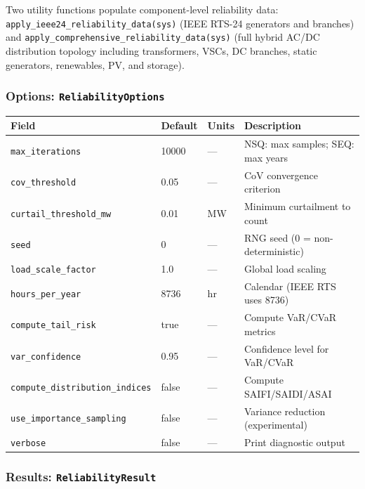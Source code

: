 Two utility functions populate component-level reliability data:
\texttt{apply\_ieee24\_reliability\_data(sys)} (IEEE RTS-24 generators and
branches) and \texttt{apply\_comprehensive\_reliability\_data(sys)} (full
hybrid AC/DC distribution topology including transformers, VSCs, DC branches,
static generators, renewables, PV, and storage).

\subsubsection{Options: \texttt{ReliabilityOptions}}

\begin{center}
\begin{tabular}{llll}
\hline\hline
\textbf{Field} & \textbf{Default} & \textbf{Units} & \textbf{Description} \\
\hline
\texttt{max\_iterations} & 10000 & --- & NSQ: max samples; SEQ: max years \\
\texttt{cov\_threshold} & 0.05 & --- & CoV convergence criterion \\
\texttt{curtail\_threshold\_mw} & 0.01 & MW & Minimum curtailment to count \\
\texttt{seed} & 0 & --- & RNG seed (0 = non-deterministic) \\
\texttt{load\_scale\_factor} & 1.0 & --- & Global load scaling \\
\texttt{hours\_per\_year} & 8736 & hr & Calendar (IEEE RTS uses 8736) \\
\texttt{compute\_tail\_risk} & true & --- & Compute VaR/CVaR metrics \\
\texttt{var\_confidence} & 0.95 & --- & Confidence level for VaR/CVaR \\
\texttt{compute\_distribution\_indices} & false & --- & Compute SAIFI/SAIDI/ASAI \\
\texttt{use\_importance\_sampling} & false & --- & Variance reduction (experimental) \\
\texttt{verbose} & false & --- & Print diagnostic output \\
\hline\hline
\end{tabular}
\end{center}

\subsubsection{Results: \texttt{ReliabilityResult}}

